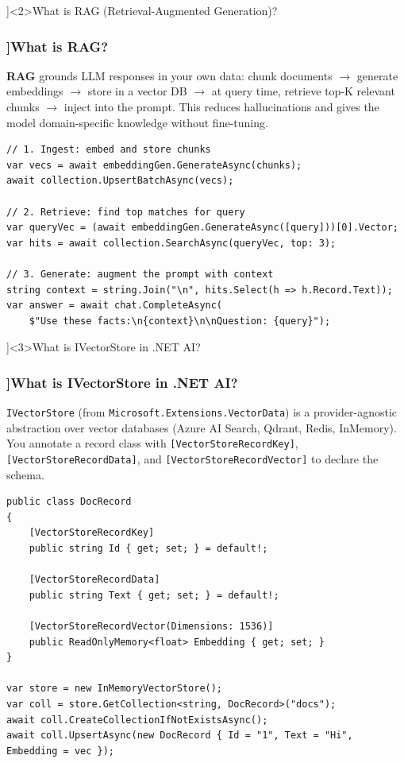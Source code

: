 \QuestionSlide[\CategoryBadge[AIColor!20]{AI \& .NET}]<2>{What is RAG (Retrieval-Augmented Generation)?}

\begin{frame}[fragile]
  \frametitle{\AnswerTitle[\CategoryBadge[AIColor!20]{AI \& .NET}]{What is RAG?}}

  {\footnotesize
  \textbf{RAG} grounds LLM responses in your own data: chunk documents $\to$ generate embeddings $\to$
  store in a vector DB $\to$ at query time, retrieve top-K relevant chunks $\to$ inject into the prompt.
  This reduces hallucinations and gives the model domain-specific knowledge without fine-tuning.
  }

  \begin{verbatim}
// 1. Ingest: embed and store chunks
var vecs = await embeddingGen.GenerateAsync(chunks);
await collection.UpsertBatchAsync(vecs);

// 2. Retrieve: find top matches for query
var queryVec = (await embeddingGen.GenerateAsync([query]))[0].Vector;
var hits = await collection.SearchAsync(queryVec, top: 3);

// 3. Generate: augment the prompt with context
string context = string.Join("\n", hits.Select(h => h.Record.Text));
var answer = await chat.CompleteAsync(
    $"Use these facts:\n{context}\n\nQuestion: {query}");
  \end{verbatim}
\end{frame}

\QuestionSlide[\CategoryBadge[AIColor!20]{AI \& .NET}]<3>{What is IVectorStore in .NET AI?}

\begin{frame}[fragile]
  \frametitle{\AnswerTitle[\CategoryBadge[AIColor!20]{AI \& .NET}]{What is IVectorStore in .NET AI?}}

  {\footnotesize
  \texttt{IVectorStore} (from \texttt{Microsoft.Extensions.VectorData}) is a provider-agnostic abstraction
  over vector databases (Azure AI Search, Qdrant, Redis, InMemory). You annotate a record class with
  \texttt{[VectorStoreRecordKey]}, \texttt{[VectorStoreRecordData]}, and \texttt{[VectorStoreRecordVector]}
  to declare the schema.
  }

  \begin{verbatim}
public class DocRecord
{
    [VectorStoreRecordKey]
    public string Id { get; set; } = default!;

    [VectorStoreRecordData]
    public string Text { get; set; } = default!;

    [VectorStoreRecordVector(Dimensions: 1536)]
    public ReadOnlyMemory<float> Embedding { get; set; }
}

var store = new InMemoryVectorStore();
var coll = store.GetCollection<string, DocRecord>("docs");
await coll.CreateCollectionIfNotExistsAsync();
await coll.UpsertAsync(new DocRecord { Id = "1", Text = "Hi", Embedding = vec });
  \end{verbatim}
\end{frame}

